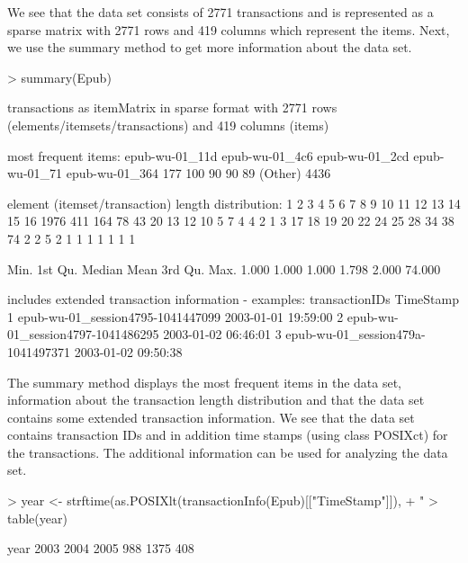 \documentclass[10pt,a4paper]{article}
\newcommand{\class}[1]{\textsf{#1}}
\begin{document}
We see that the data set consists of 2771 transactions
and is represented as a sparse matrix with 2771 rows
and 419 columns which represent the items. 
Next, we use the summary method to get more information about the 
data set.

\begin{Schunk}
\begin{Sinput}
> summary(Epub)
\end{Sinput}
\begin{Soutput}
transactions as itemMatrix in sparse format with
 2771 rows (elements/itemsets/transactions) and
 419 columns (items)

most frequent items:
epub-wu-01_11d epub-wu-01_4c6 epub-wu-01_2cd  epub-wu-01_71 epub-wu-01_364 
           177            100             90             90             89 
       (Other) 
          4436 

element (itemset/transaction) length distribution:
   1    2    3    4    5    6    7    8    9   10   11   12   13   14   15   16 
1976  411  164   78   43   20   13   12   10    5    7    4    4    2    1    3 
  17   18   19   20   22   24   25   28   34   38   74 
   2    2    5    2    1    1    1    1    1    1    1 

   Min. 1st Qu.  Median    Mean 3rd Qu.    Max. 
  1.000   1.000   1.000   1.798   2.000  74.000 

includes extended transaction information - examples:
                     transactionIDs           TimeStamp
1 epub-wu-01_session4795-1041447099 2003-01-01 19:59:00
2 epub-wu-01_session4797-1041486295 2003-01-02 06:46:01
3 epub-wu-01_session479a-1041497371 2003-01-02 09:50:38
\end{Soutput}
\end{Schunk}

The summary method displays the most frequent items in the data set,
information about the transaction length distribution and that the data
set contains some extended transaction information.  We see that the
data set contains transaction IDs and in addition time stamps (using class
\class{POSIXct}) for the
transactions.  The additional information can be used for analyzing the
data set.

\begin{Schunk}
\begin{Sinput}
> year <- strftime(as.POSIXlt(transactionInfo(Epub)[["TimeStamp"]]), 
+     "%
> table(year)
\end{Sinput}
\begin{Soutput}
year
2003 2004 2005 
 988 1375  408 

\end{Soutput}
\end{Schunk}
\end{document}
